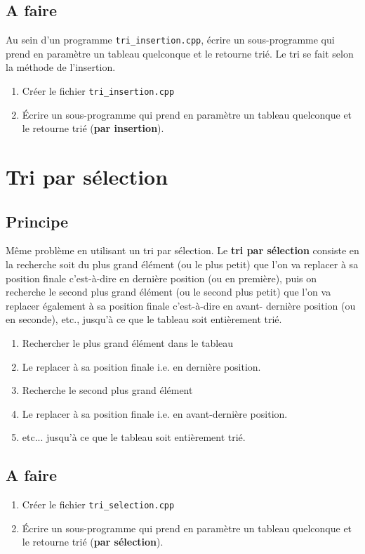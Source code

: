 \documentclass[french]{article}
\begin{document}
\subsection*{A faire}
 Au sein d’un programme \texttt{tri\_insertion.cpp}, écrire un sous-programme qui prend en paramètre un tableau quelconque et le retourne trié. Le tri se fait selon la méthode de l’insertion. 
\begin{enumerate}
	\item Créer le fichier \texttt{tri\_insertion.cpp}
	\item Écrire un sous-programme qui prend en paramètre un tableau quelconque et le retourne trié (\textbf{par insertion}).
\end{enumerate}

\section{Tri par sélection}

\subsection*{Principe}

Même problème en utilisant un tri par sélection. Le \textbf{tri par sélection} consiste en la recherche soit du plus grand élément (ou le plus petit) que l'on va replacer à sa position finale c'est-à-dire en dernière position (ou en première), puis on recherche le second plus grand élément (ou le second plus petit) que l'on va replacer également à sa position finale c'est-à-dire en avant- dernière position (ou en seconde), etc., jusqu'à ce que le tableau soit entièrement trié.
\begin{enumerate}
	\item Rechercher le plus grand élément dans le tableau
	\item Le replacer à sa position finale i.e. en dernière position.
	\item Recherche le second plus grand élément
	\item Le replacer à sa position finale i.e. en avant-dernière position.
	\item etc... jusqu'à ce que le tableau soit entièrement trié.
\end{enumerate} 
\subsection*{A faire}
\begin{enumerate}
	\item Créer le fichier \texttt{tri\_selection.cpp}
	\item Écrire un sous-programme qui prend en paramètre un tableau quelconque et le retourne trié (\textbf{par sélection}).
\end{enumerate}
\end{document}
